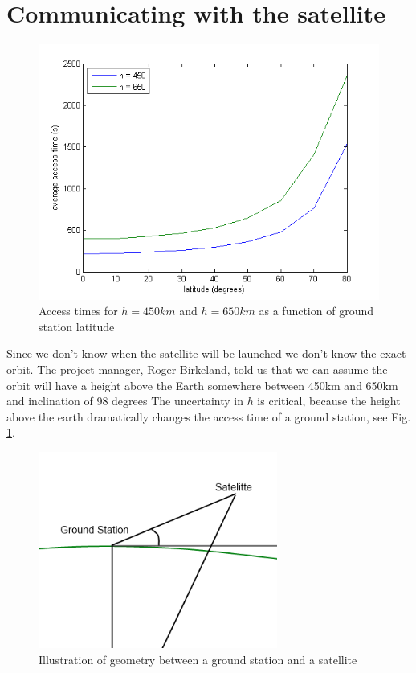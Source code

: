 \section{Communicating with the satellite}

\begin{figure}
  \begin{center}
    \includegraphics[width=1.0\textwidth]{Figures/accesstid450og650}
  \end{center}
  \caption[Accesstid for 450 og 650]{Access times for $h=450km$ and $h=650km$ as a function of ground station latitude}
  \label{fig:acctid}
\end{figure}

Since we don't know when the satellite will be launched we don't know the exact orbit. The project manager, Roger Birkeland, told us that we can assume the orbit will  have a height above the Earth somewhere between 450km and 650km and inclination of 98 degrees The uncertainty in $h$ is critical, because the height above the earth dramatically changes the access time of a ground station, see Fig. \ref{fig:acctid}. 

\begin{figure}
  \begin{center}
    \includegraphics[width=0.7\textwidth]{Figures/groundstation_satelitte_geometry}
  \end{center}
  \caption[Ground station satellite geometry]{Illustration of geometry between a ground station and a satellite}
  \label{fig:gs_s_geom}
\end{figure}

